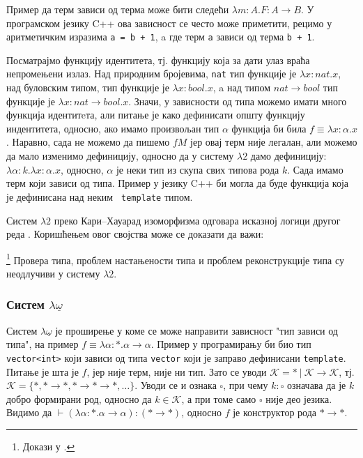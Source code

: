 Пример да терм зависи од терма може бити следећи $\lambda m:A.F: A \to
B$. У програмском језику C++ ова зависност се често може приметити,
рецимо у аритметичким изразима {\tt a = b + 1}, a где терм {\tt a}
зависи од терма {\tt b + 1}.

Посматрајмо функцију идентитета, тј. функцију која за дати улаз враћа
непромењени излаз. Над природним бројевима, {\tt nat} тип функције је
$\lambda x: nat. x$, над буловским типом, тип функције је $\lambda x:
bool. x$, a над типом $nat \to bool$ тип функције је $\lambda x: nat
\to bool. x$. Значи, у зависности од типа можемо имати много функција
идентитeта, али питање је како дефинисати општу функцију индентитета,
односно, ако имамо произвољан тип $\alpha$ функција би била $f \equiv
\lambda x: \alpha. x$. Наравно, сада не можемо да пишемо $f M$ јер
овај терм није легалан, али можемо да мало изменимо дефиницију,
односно да у систему $\lambda2$ дамо дефиницију: $\lambda \alpha:
k. \lambda x : \alpha. x$, односно, $\alpha$ је неки тип из скупа свих
типова рода $k$. Сада имамо терм који зависи од типа. Пример у језику
C++ би могла да буде функција која је дефинисана над неким {\tt
  template} типом.

Систем $\lambda2$ преко Кари--Хауарад изоморфизма одговара исказној
логици другог реда \cite{girard1972interpretation, girard1986system,
  girard1989proofs}. Коришћењем овог својства може се доказати да важи:

\begin{theorem} \footnote{Докази у \cite{barendregt2013lambda}.} 
Провера типа, проблем настањености типа и проблем реконструкције типа
су неодлучиви у систему $\lambda2$.
\end{theorem}


\subsubsection{Систем $\lambda\underline{\omega}$}

Систем $\lambda\underline{\omega}$ је проширење у коме се може
направити зависност "тип зависи од типа", на пример $ f \equiv \lambda
\alpha:*. \alpha \to \alpha$. Пример у програмирању би био тип {\tt
  vector<int>} који зависи од типа {\tt vector} који је заправо
дефинисани {\tt template}.  Питање је шта је $f$, јер није терм, није
ни тип. Зато се уводи $\mathcal{K} = *\ |\ \mathcal{K} \to
\mathcal{K}$, тј. $\mathcal{K} = \{*, *\to*, *\to*\to*, \ldots\}$.
Уводи се и ознака $\square$, при чему $k : \square$ означава да је $k$
добро формирани род, односно да $k \in \mathcal{K}$, а при томе само
$\square$ није део језика. Видимо да $\vdash (\lambda \alpha:*. \alpha
\to \alpha) : (* \to *)$, односно $f$ је конструктор рода $* \to *$.

